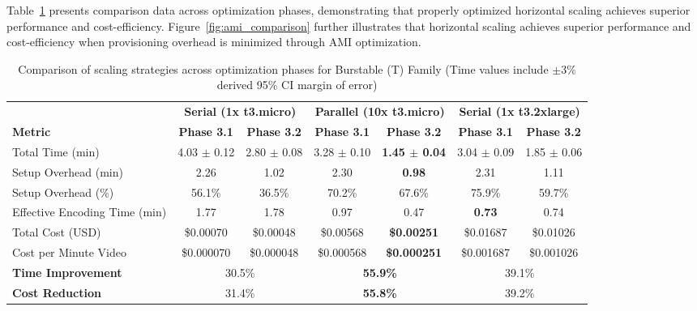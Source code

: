 \documentclass[conference]{IEEEtran}
\begin{document}
	Table~\ref{tab:unified_case_study} presents comparison data across optimization phases, demonstrating that properly optimized horizontal scaling achieves superior performance and cost-efficiency. Figure~\ref{fig:ami_comparison} further illustrates that horizontal scaling achieves superior performance and cost-efficiency when provisioning overhead is minimized through AMI optimization.
	
	\begin{table}[!htpb]
		\centering
		\caption{Comparison of scaling strategies across optimization phases for Burstable (T) Family (Time values include $\pm$3\% derived 95\% CI margin of error)}
		\label{tab:unified_case_study}
		\begin{tabular*}{\textwidth}{l @{\extracolsep{\fill}} | cc | cc | cc}
			\toprule
			& \multicolumn{2}{c|}{\textbf{Serial (1x t3.micro)}} & \multicolumn{2}{c|}{\textbf{Parallel (10x t3.micro)}} & \multicolumn{2}{c}{\textbf{Serial (1x t3.2xlarge)}} \\
			\cmidrule(lr){2-3} \cmidrule(lr){4-5} \cmidrule(lr){6-7}
			\textbf{Metric} & \textbf{Phase 3.1} & \textbf{Phase 3.2} & \textbf{Phase 3.1} & \textbf{Phase 3.2} & \textbf{Phase 3.1} & \textbf{Phase 3.2} \\
			\midrule
			Total Time (min)          & 4.03 $\pm$ 0.12  & 2.80 $\pm$ 0.08  & 3.28 $\pm$ 0.10 & \textbf{1.45 $\pm$ 0.04} & 3.04 $\pm$ 0.09 & 1.85 $\pm$ 0.06 \\
			Setup Overhead (min)      & 2.26  & 1.02  & 2.30 & \textbf{0.98} & 2.31 & 1.11 \\
			Setup Overhead (\%)       & 56.1\% & 36.5\% & 70.2\% & 67.6\% & 75.9\% & 59.7\% \\
			Effective Encoding Time (min) & 1.77  & 1.78  & 0.97 & 0.47 & \textbf{0.73} & 0.74 \\
			\midrule
			Total Cost (USD)          & \$0.00070 & \$0.00048 & \$0.00568 & \textbf{\$0.00251} & \$0.01687 & \$0.01026 \\
			Cost per Minute Video     & \$0.000070 & \$0.000048 & \$0.000568 & \textbf{\$0.000251} & \$0.001687 & \$0.001026 \\
			\midrule \midrule
			\textbf{Time Improvement} & \multicolumn{2}{c|}{30.5\%} & \multicolumn{2}{c|}{\textbf{55.9\%}} & \multicolumn{2}{c}{39.1\%} \\
			\textbf{Cost Reduction}   & \multicolumn{2}{c|}{31.4\%} & \multicolumn{2}{c|}{\textbf{55.8\%}} & \multicolumn{2}{c}{39.2\%} \\
			\bottomrule
		\end{tabular*}
	\end{table}
	
\end{document}
